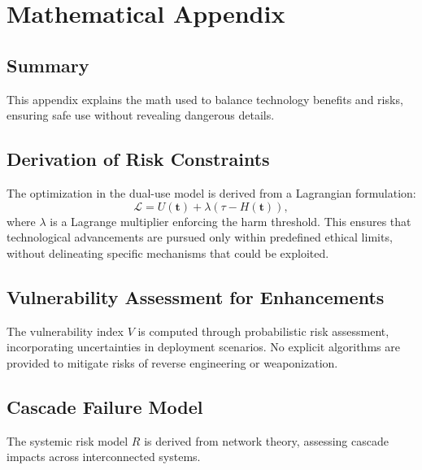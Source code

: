 \documentclass[11pt,oneside]{memoir}
\theoremstyle{plain}
\begin{document}
\section{Mathematical Appendix}
\subsection{Summary}
This appendix explains the math used to balance technology benefits and risks, ensuring safe use without revealing dangerous details.

\subsection{Derivation of Risk Constraints}
The optimization in the dual-use model is derived from a Lagrangian formulation:
\begin{equation}
    \mathcal{L} = U(\mathbf{t}) + \lambda (\tau - H(\mathbf{t})),
\end{equation}
where \(\lambda\) is a Lagrange multiplier enforcing the harm threshold. This ensures that technological advancements are pursued only within predefined ethical limits, without delineating specific mechanisms that could be exploited.

\subsection{Vulnerability Assessment for Enhancements}
The vulnerability index \(V\) is computed through probabilistic risk assessment, incorporating uncertainties in deployment scenarios. No explicit algorithms are provided to mitigate risks of reverse engineering or weaponization.

\subsection{Cascade Failure Model}
The systemic risk model \(R\) is derived from network theory, assessing cascade impacts across interconnected systems.
\end{document}
